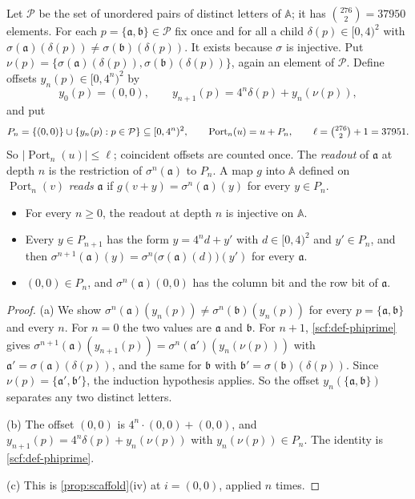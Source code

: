 Let $\mathcal P$ be the set of unordered pairs of distinct letters of $\mathbb A$; it has $\binom{276}{2}=37950$ elements. For each $p=\{\mathfrak a,\mathfrak b\}\in\mathcal P$ fix once and for all a child $\delta(p)\in[0,4)^2$ with $\sigma(\mathfrak a)(\delta(p))\ne\sigma(\mathfrak b)(\delta(p))$. It exists because $\sigma$ is injective. Put $\nu(p)=\{\sigma(\mathfrak a)(\delta(p)),\sigma(\mathfrak b)(\delta(p))\}$, again an element of $\mathcal P$. Define offsets $y_n(p)\in[0,4^n)^2$ by
\[
y_0(p)=(0,0),\qquad y_{n+1}(p)=4^n\delta(p)+y_n(\nu(p)),
\]
and put
\[
P_n=\{(0,0)\}\cup\{y_n(p):p\in\mathcal P\}\subseteq[0,4^n)^2,\qquad \operatorname{Port}_n(u)=u+P_n,\qquad \ell=\tbinom{276}{2}+1=37951 .
\]
So $|\operatorname{Port}_n(u)|\le\ell$; coincident offsets are counted once. The \emph{readout} of $\mathfrak a$ at depth $n$ is the restriction of $\sigma^n(\mathfrak a)$ to $P_n$. A map $g$ into $\mathbb A$ defined on $\operatorname{Port}_n(v)$ \emph{reads} $\mathfrak a$ if $g(v+y)=\sigma^n(\mathfrak a)(y)$ for every $y\in P_n$.

\begin{lemma}\label{scf:ports}
\begin{itemize}
\item[(a)] For every $n\ge0$, the readout at depth $n$ is injective on $\mathbb A$.
\item[(b)] Every $y\in P_{n+1}$ has the form $y=4^nd+y'$ with $d\in[0,4)^2$ and $y'\in P_n$, and then $\sigma^{n+1}(\mathfrak a)(y)=\sigma^n\bigl(\sigma(\mathfrak a)(d)\bigr)(y')$ for every $\mathfrak a$.
\item[(c)] $(0,0)\in P_n$, and $\sigma^n(\mathfrak a)(0,0)$ has the column bit and the row bit of $\mathfrak a$.
\end{itemize}
\end{lemma}

\begin{proof}
(a) We show $\sigma^n(\mathfrak a)(y_n(p))\ne\sigma^n(\mathfrak b)(y_n(p))$ for every $p=\{\mathfrak a,\mathfrak b\}$ and every $n$. For $n=0$ the two values are $\mathfrak a$ and $\mathfrak b$. For $n+1$, \cref{scf:def-phiprime} gives $\sigma^{n+1}(\mathfrak a)(y_{n+1}(p))=\sigma^n(\mathfrak a')(y_n(\nu(p)))$ with $\mathfrak a'=\sigma(\mathfrak a)(\delta(p))$, and the same for $\mathfrak b$ with $\mathfrak b'=\sigma(\mathfrak b)(\delta(p))$. Since $\nu(p)=\{\mathfrak a',\mathfrak b'\}$, the induction hypothesis applies. So the offset $y_n(\{\mathfrak a,\mathfrak b\})$ separates any two distinct letters.

(b) The offset $(0,0)$ is $4^n\cdot(0,0)+(0,0)$, and $y_{n+1}(p)=4^n\delta(p)+y_n(\nu(p))$ with $y_n(\nu(p))\in P_n$. The identity is \cref{scf:def-phiprime}.

(c) This is \cref{prop:scaffold}(iv) at $i=(0,0)$, applied $n$ times.
\end{proof}

